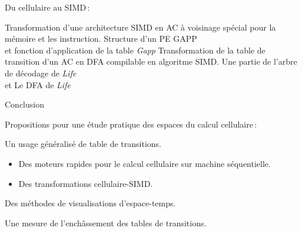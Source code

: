 \documentclass[a4paper,dvips]{slides}
\renewcommand{\arule}[1]{\emph{\mbox{#1}}} %
\newenvironment{mynote}{\begin{note}\begin{scriptsize}}{\end{scriptsize}\end{note}}
\newcommand{\mytitle}[1]{\begin{center}\begin{large}#1\end{large}\end{center}}
\begin{document}

\begin{slide}
  \mytitle{Du cellulaire au SIMD\,:}
  Transformation d'une architecture SIMD en AC \`a voisinage sp\'ecial pour la
  m\'emoire et les instruction.
  {Structure d'un PE GAPP\\
    et fonction d'application de la table \arule{Gapp}}
  Transformation de la table de transition d'un AC en DFA compilable en
  algoritme SIMD.
  {Une partie de l'arbre de d\'ecodage de \arule{Life}\\
    et Le DFA de \arule{Life}}
\end{slide}


\begin{slide}
  \begin{center}
    \begin{Large}
      Conclusion
    \end{Large}
  \end{center}
  \mytitle{Propositions pour une \'etude pratique des espaces du calcul
    cellulaire\,:}

  Un usage g\'en\'eralis\'e de table de transitions.
  \begin{itemize}
  \item Des moteurs rapides pour le calcul cellulaire sur machine
    s\'equentielle.
  \item Des transformations cellulaire-SIMD.
  \end{itemize}
  Des m\'ethodes de visualisations d'espace-temps.

  Une mesure de l'ench\^assement des tables de transitions.
\end{slide}
\end{document}

